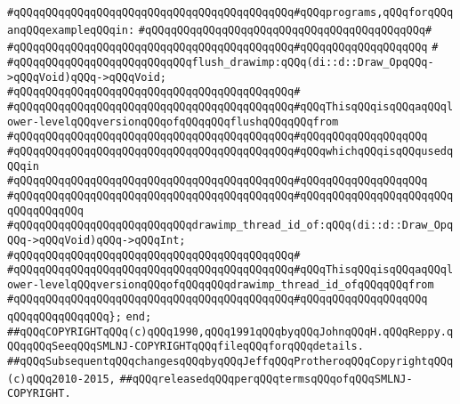 \verb|#qQQqqQQqqQQqqQQqqQQqqQQqqQQqqQQqqQQqqQQqqQQq#qQQqprograms,qQQqforqQQqanqQQqexampleqQQqin:|\newline
\verb|#qQQqqQQqqQQqqQQqqQQqqQQqqQQqqQQqqQQqqQQqqQQq#|\newline
\verb|#qQQqqQQqqQQqqQQqqQQqqQQqqQQqqQQqqQQqqQQqqQQq#qQQqqQQqqQQqqQQqqQQq|\newline
\verb|#|\newline
\verb|#qQQqqQQqqQQqqQQqqQQqqQQqqQQqflush_drawimp:qQQq(di::d::Draw_OpqQQq->qQQqVoid)qQQq->qQQqVoid;|\newline
\verb|#qQQqqQQqqQQqqQQqqQQqqQQqqQQqqQQqqQQqqQQqqQQq#|\newline
\verb|#qQQqqQQqqQQqqQQqqQQqqQQqqQQqqQQqqQQqqQQqqQQq#qQQqThisqQQqisqQQqaqQQqlower-levelqQQqversionqQQqofqQQqqQQqflushqQQqqQQqfrom|\newline
\verb|#qQQqqQQqqQQqqQQqqQQqqQQqqQQqqQQqqQQqqQQqqQQq#qQQqqQQqqQQqqQQqqQQq|\newline
\verb|#qQQqqQQqqQQqqQQqqQQqqQQqqQQqqQQqqQQqqQQqqQQq#qQQqwhichqQQqisqQQqusedqQQqin|\newline
\verb|#qQQqqQQqqQQqqQQqqQQqqQQqqQQqqQQqqQQqqQQqqQQq#qQQqqQQqqQQqqQQqqQQq|\newline
\verb|#qQQqqQQqqQQqqQQqqQQqqQQqqQQqqQQqqQQqqQQqqQQq#qQQqqQQqqQQqqQQqqQQq|\verb|qQQqqQQqqQQqqQQq|\newline
\newline
\verb|#qQQqqQQqqQQqqQQqqQQqqQQqqQQqdrawimp_thread_id_of:qQQq(di::d::Draw_OpqQQq->qQQqVoid)qQQq->qQQqInt;|\newline
\verb|#qQQqqQQqqQQqqQQqqQQqqQQqqQQqqQQqqQQqqQQqqQQq#|\newline
\verb|#qQQqqQQqqQQqqQQqqQQqqQQqqQQqqQQqqQQqqQQqqQQq#qQQqThisqQQqisqQQqaqQQqlower-levelqQQqversionqQQqofqQQqqQQqdrawimp_thread_id_ofqQQqqQQqfrom|\newline
\verb|#qQQqqQQqqQQqqQQqqQQqqQQqqQQqqQQqqQQqqQQqqQQq#qQQqqQQqqQQqqQQqqQQq|\newline
\verb|qQQqqQQqqQQqqQQq};|\newline
\newline
\verb|end;|\newline
\newline
\verb|##qQQqCOPYRIGHTqQQq(c)qQQq1990,qQQq1991qQQqbyqQQqJohnqQQqH.qQQqReppy.qQQqqQQqSeeqQQqSMLNJ-COPYRIGHTqQQqfileqQQqforqQQqdetails.|\newline
\verb|##qQQqSubsequentqQQqchangesqQQqbyqQQqJeffqQQqProtheroqQQqCopyrightqQQq(c)qQQq2010-2015,|\newline
\verb|##qQQqreleasedqQQqperqQQqtermsqQQqofqQQqSMLNJ-COPYRIGHT.|\newline

